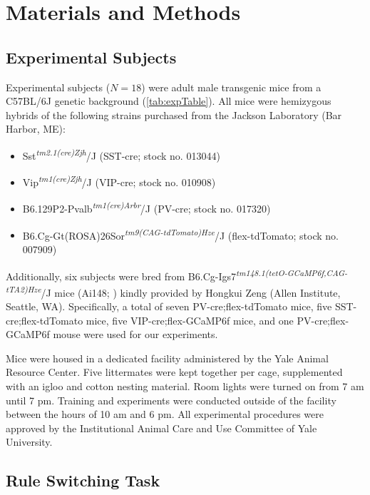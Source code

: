\section{Materials and Methods}

\newcommand{\tg}[1]{\textsuperscript{\textit{#1}}}

\subsection*{Experimental Subjects}
Experimental subjects ($N=18$) were adult male transgenic mice from a C57BL/6J genetic background (\ref{tab:expTable}). All mice were hemizygous hybrids of the following strains purchased from the Jackson Laboratory (Bar Harbor, ME):
\begin{itemize}
  \item Sst\tg{tm2.1(cre)Zjh}/J (SST-cre; stock no. 013044)
  \item Vip\tg{tm1(cre)Zjh}/J (VIP-cre; stock no. 010908)
  \item B6.129P2-Pvalb\tg{tm1(cre)Arbr}/J (PV-cre; stock no. 017320)
  \item B6.Cg-Gt(ROSA)26Sor\tg{tm9(CAG-tdTomato)Hze}/J (flex-tdTomato; stock no. 007909)
\end{itemize}
Additionally, six subjects were bred from B6.Cg-Igs7\tg{tm148.1(tetO-GCaMP6f,CAG-tTA2)Hze}/J mice (Ai148; \cite{daigle18}) kindly provided by Hongkui Zeng (Allen Institute, Seattle, WA). Specifically, a total of seven PV-cre;flex-tdTomato mice, five SST-cre;flex-tdTomato mice, five VIP-cre;flex-GCaMP6f mice, and one PV-cre;flex-GCaMP6f mouse were used for our experiments.

Mice were housed in a dedicated facility administered by the Yale Animal Resource Center. Five littermates were kept together per cage, supplemented with an igloo and cotton nesting material. Room lights were turned on from 7 am until 7 pm. Training and experiments were conducted outside of the facility between the hours of 10 am and 6 pm. All experimental procedures were approved by the Institutional Animal Care and Use Committee of Yale University.

\subsection*{Rule Switching Task}


